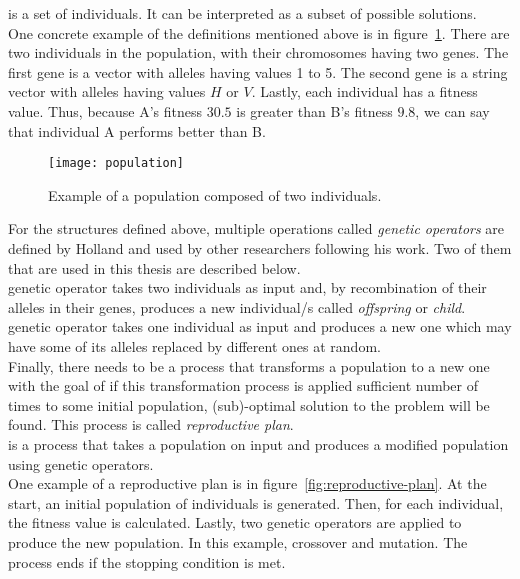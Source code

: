  is a set of individuals.
It can be interpreted as a subset of possible solutions.\\

One concrete example of the definitions mentioned above is in figure~\ref{fig:population}.
There are two individuals in the population, with their chromosomes having two genes.
The first gene is a vector with alleles having values 1 to 5. The second gene is a string vector
with alleles having values $H$ or $V$. Lastly, each individual has a fitness value.
Thus, because A’s fitness $30.5$ is greater than B’s fitness $9.8$, we can say
that individual A performs better than B.


\begin{figure}
    \texttt{[image: population]}
    \caption[Population example]{Example of a population composed of two individuals.}
    \label{fig:population}
\end{figure}

For the structures defined above, multiple operations called \textit{genetic operators}
are defined by Holland and used by other researchers following his work.
Two of them that are used in this thesis are described below.\\

 genetic operator takes two individuals as input and, by recombination
of their alleles in their genes, produces a new individual/s called \textit{offspring} or \textit{child}.\\

 genetic operator takes one individual as input and produces a new one
which may have some of its alleles replaced by different ones at random.\\

Finally, there needs to be a process that transforms a population
to a new one with the goal of if this transformation process is applied sufficient
number of times to some initial population,
(sub)-optimal solution to the problem will be found.
This process is called \textit{reproductive plan}.\\

 is a process that takes a population on input and produces a modified
population using genetic operators.\\

One example of a reproductive plan is in figure~\ref{fig:reproductive-plan}.
At the start, an initial population of individuals is generated.
Then, for each individual, the fitness value is calculated.
Lastly, two genetic operators are applied to produce the new population.
In this example, crossover and mutation.
The process ends if the stopping condition is met.

